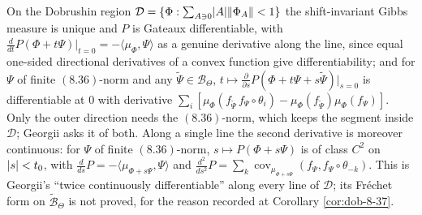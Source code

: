 \begin{theorem}
    \label{thm:gv-16-17}
    \leanok

    On the Dobrushin region $\mathcal D = \{\Phi : \sum_{A \ni 0}\lvert A\rvert\lVert \Phi_A\rVert < 1\}$ the
    shift-invariant Gibbs measure is unique and $P$ is Gateaux differentiable, with
    $\frac{d}{dt}P(\Phi + t\Psi)\big|_{t=0} = -\langle\mu_\Phi,\Psi\rangle$ as a genuine
    derivative along the line, since equal one-sided directional derivatives of a convex
    function give differentiability; and for
    $\Psi$ of finite $(8.36)$-norm and any $\tilde\Psi \in \mathcal B_\Theta$,
    $t \mapsto \frac{\partial}{\partial s}P(\Phi + t\Psi + s\tilde\Psi)\big|_{s=0}$ is
    differentiable at $0$ with derivative
    $\sum_i [\mu_\Phi(f_{\tilde\Psi}\,f_\Psi\circ\theta_i) - \mu_\Phi(f_{\tilde\Psi})\mu_\Phi(f_\Psi)]$.
    Only the outer direction needs the $(8.36)$-norm, which keeps the segment inside
    $\mathcal D$; Georgii asks it of both. Along a single line the second derivative is
    moreover continuous: for $\Psi$ of finite $(8.36)$-norm, $s \mapsto P(\Phi + s\Psi)$ is of
    class $C^2$ on $\lvert s\rvert < t_0$, with $\frac{d}{ds}P = -\langle\mu_{\Phi+s\Psi},\Psi\rangle$
    and $\frac{d^2}{ds^2}P = \sum_k \operatorname{cov}_{\mu_{\Phi+s\Psi}}(f_\Psi, f_\Psi\circ
    \theta_{-k})$. This is Georgii's ``twice continuously differentiable'' along every line of
    $\mathcal D$; its Fr\'echet form on $\widetilde{\mathcal B}_\Theta$ is not proved, for the
    reason recorded at Corollary \ref{cor:dob-8-37}.
\end{theorem}
